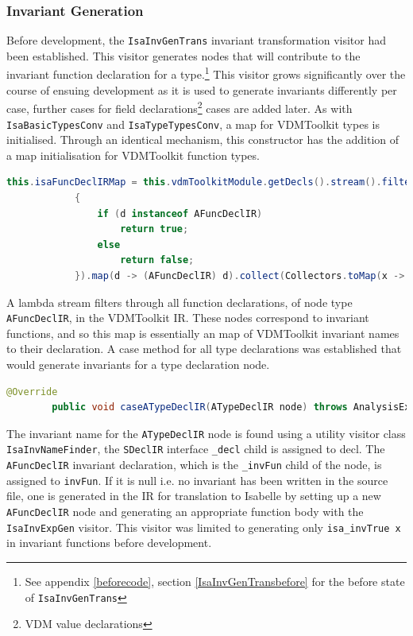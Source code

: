 	\subsubsection{Invariant Generation} \label{iigt}
	Before development, the \lstinline[language=Java]{IsaInvGenTrans} invariant transformation visitor had been established. This visitor generates nodes that will contribute to the invariant function declaration for a type.\footnote{See appendix \ref{beforecode}, section \ref{IsaInvGenTransbefore} for the before state of \lstinline[language=Java]{IsaInvGenTrans}} 
	This visitor grows significantly over the course of ensuing development as it is used to generate invariants differently per case, further cases for field declarations\footnote{VDM value declarations} cases are added later. As with \lstinline[language=Java]{IsaBasicTypesConv} and \lstinline[language=Java]{IsaTypeTypesConv}, a map for VDMToolkit types is initialised. Through an identical mechanism, this constructor has the addition of a map initialisation for VDMToolkit function types.
	\begin{lstlisting}[language=Java]
	this.isaFuncDeclIRMap = this.vdmToolkitModule.getDecls().stream().filter(d ->
	        {
	            if (d instanceof AFuncDeclIR)
	                return true;
	            else
	                return false;
	        }).map(d -> (AFuncDeclIR) d).collect(Collectors.toMap(x -> x.getName(), x -> x));
	\end{lstlisting}
	A lambda stream filters through all function declarations, of node type \lstinline[language=Java]{AFuncDeclIR}, in the VDMToolkit IR. These nodes correspond to invariant functions, and so this map is essentially an map of VDMToolkit invariant names to their declaration. A case method for all type declarations was established that would generate invariants for a type declaration node.
	\begin{lstlisting}[language=Java]
	@Override
	    public void caseATypeDeclIR(ATypeDeclIR node) throws AnalysisException {
	\end{lstlisting}
	The invariant name for the \lstinline[language=Java]{ATypeDeclIR} node is found using a utility visitor class \lstinline[language=Java]{IsaInvNameFinder}, the \lstinline[language=Java]{SDeclIR} interface \lstinline[language=Java]{_decl} child is assigned to decl. The \lstinline[language=Java]{AFuncDeclIR} invariant declaration, which is the \lstinline[language=Java]{_invFun} child of the node, is assigned to \lstinline[language=Java]{invFun}. If it is null i.e. no invariant has been written in the source file, one is generated in the IR for translation to Isabelle by setting up a new \lstinline[language=Java]{AFuncDeclIR} node and generating an appropriate function body with the \lstinline[language=Java]{IsaInvExpGen} visitor. This visitor was limited to generating only \lstinline[language=Isabelle]{isa_invTrue x} in invariant functions before development. 


